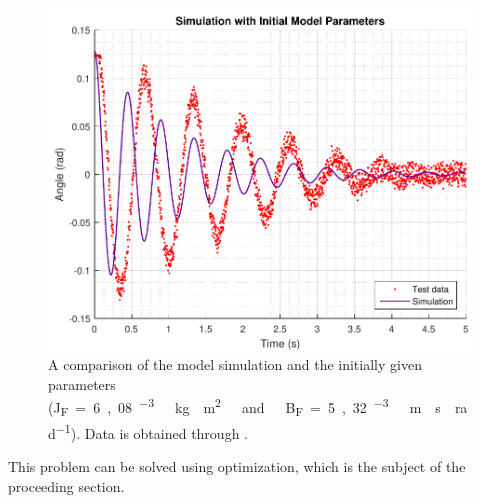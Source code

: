 \begin{figure}[H] 
	\centering
	\includegraphics[width=.6\textwidth]{figures/InitialModelParameterCompare}
	\caption{A comparison of the model simulation and the initially given parameters (\si{J_F=6,08 ^{-3}\ kg \cdot m^2\ and\ B_F=5,32 ^{-3}\ m \cdot s \cdot rad^{-1}}). Data is obtained through .}
	\label{InitialModelParameterCompare}
\end{figure}
%
This problem can be solved using optimization, which is the subject of the proceeding section.